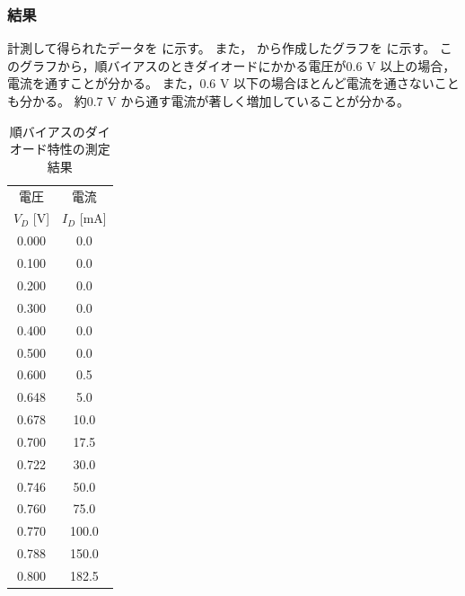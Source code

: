 \subsubsection{結果}
  計測して得られたデータを に示す。
  また， から作成したグラフを に示す。
  このグラフから，順バイアスのときダイオードにかかる電圧が0.6 V 以上の場合，電流を通すことが分かる。
  また，0.6 V 以下の場合ほとんど電流を通さないことも分かる。
  約0.7 V から通す電流が著しく増加していることが分かる。

  \begin{table}[hbt]
    \centering
    \caption{順バイアスのダイオード特性の測定結果}
    \begin{tabular}{|c|c|} \hline
        電圧 & 電流 \\
        $V_D$ [V] & $I_D$ [mA] \\ \hline
        0.000 & 0.0 \\ \hline
        0.100 & 0.0 \\ \hline
        0.200 & 0.0 \\ \hline
        0.300 & 0.0 \\ \hline
        0.400 & 0.0 \\ \hline
        0.500 & 0.0 \\ \hline
        0.600 & 0.5 \\ \hline
        0.648 & 5.0 \\ \hline
        0.678 & 10.0 \\ \hline
        0.700 & 17.5 \\ \hline
        0.722 & 30.0 \\ \hline
        0.746 & 50.0 \\ \hline
        0.760 & 75.0 \\ \hline
        0.770 & 100.0 \\ \hline
        0.788 & 150.0 \\ \hline
        0.800 & 182.5 \\ \hline
    \end{tabular}
    \label{tab:diode1_result}
  \end{table}

